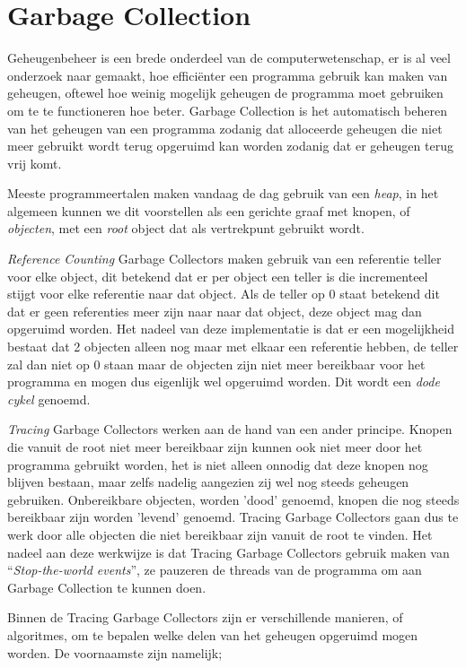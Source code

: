 \section{Garbage Collection}
\label{sec:Garbage collection}
Geheugenbeheer is een brede onderdeel van de computerwetenschap, er is al veel onderzoek naar gemaakt, hoe efficiënter een programma gebruik kan maken van geheugen, oftewel hoe weinig mogelijk geheugen de programma moet gebruiken om te te functioneren hoe beter.
Garbage Collection is het automatisch beheren van het geheugen van een programma zodanig dat alloceerde geheugen die niet meer gebruikt wordt terug opgeruimd kan worden zodanig dat er geheugen terug vrij komt.

Meeste programmeertalen maken vandaag de dag gebruik van een \textit{heap}, in het algemeen kunnen we dit voorstellen als een gerichte graaf met knopen, of \textit{objecten}, met een \textit{root} object dat als vertrekpunt gebruikt wordt.

\textit{Reference Counting} Garbage Collectors maken gebruik van een referentie teller voor elke object, dit betekend dat er per object een teller is die incrementeel stijgt voor elke referentie naar dat object.
Als de teller op 0 staat betekend dit dat er geen referenties meer zijn naar naar dat object, deze object mag dan  opgeruimd worden.
Het nadeel van deze implementatie is dat er een mogelijkheid bestaat dat 2 objecten alleen nog maar met elkaar een referentie hebben, de teller zal dan niet op 0 staan maar de objecten zijn niet meer bereikbaar voor het programma en mogen dus eigenlijk wel opgeruimd worden.
Dit wordt een \textit{dode cykel} genoemd.\autocite{VanderCruysse2019}

\textit{Tracing} Garbage Collectors werken aan de hand van een ander principe.
Knopen die vanuit de root niet meer bereikbaar zijn kunnen ook niet meer door het programma gebruikt worden, het is niet alleen onnodig dat deze knopen nog blijven bestaan, maar zelfs nadelig aangezien zij wel nog steeds geheugen gebruiken.
Onbereikbare objecten, worden 'dood' genoemd, knopen die nog steeds bereikbaar zijn worden 'levend' genoemd.
Tracing Garbage Collectors gaan dus te werk door alle objecten die niet bereikbaar zijn vanuit de root te vinden. 
Het nadeel aan deze werkwijze is dat Tracing Garbage Collectors gebruik maken van ``\textit{Stop-the-world events}'', ze pauzeren de threads van de programma om aan Garbage Collection te kunnen doen.

Binnen de Tracing Garbage Collectors zijn er verschillende manieren, of algoritmes, om te bepalen welke delen van het geheugen opgeruimd mogen worden.
De voornaamste zijn namelijk;
